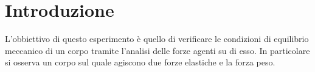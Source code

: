 \section*{Introduzione}

L'obbiettivo di questo esperimento è quello di verificare le condizioni di equilibrio meccanico di un corpo tramite l'analisi delle forze
agenti su di esso. In particolare si osserva un corpo sul quale agiscono due forze elastiche e la forza peso.\\
